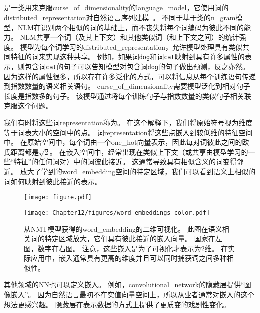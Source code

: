 \subsection{}
\label{sec:neural_language_models}

是一类用来克服\gls{curse_of_dimensionality}的\gls{language_model}，它使用词的\gls{distributed_representation}对自然语言序列建模~\citep{BenDucVin01-small}。
不同于基于类的\gls{n_gram}模型，\gls{NLM}在识别两个相似的词的基础上，而不丧失将每个词编码为彼此不同的能力。
\gls{NLM}共享一个词（及其上下文）和其他类似词（和上下文之间）的统计强度。
模型为每个词学习的\gls{distributed_representation}，允许模型处理具有类似共同特征的词来实现这种共享。
例如，如果词{\tt dog}和词{\tt cat}映射到具有许多属性的表示，则包含词{\tt cat}的句子可以告知模型对包含词{\tt dog}的句子做出预测，反之亦然。
因为这样的属性很多，所以存在许多泛化的方式，可以将信息从每个训练语句传递到指数数量的语义相关语句。
\gls{curse_of_dimensionality}需要模型泛化到相对句子长度是指数多的句子。
该模型通过将每个训练句子与指数数量的类似句子相关联克服这个问题。


我们有时将这些词\gls{representation}称为。
在这个解释下，我们将原始符号视为维度等于词表大小的空间中的点。
词\gls{representation}将这些点嵌入到较低维的特征空间中。
在原始空间中，每个词由一个\gls{one_hot}向量表示，因此每对词彼此之间的欧氏距离都是$\sqrt{2}$。
在嵌入空间中，经常出现在类似上下文（或共享由模型学习的一些``特征''的任何词对）中的词彼此接近。
这通常导致具有相似含义的词变得邻近。
放大了学到的\gls{word_embedding}空间的特定区域，我们可以看到语义上相似的词如何映射到彼此接近的表示。

\begin{figure}[htp]
\centering
\ifOpenSource
\centerline{\texttt{[image: figure.pdf]}}
\else
\texttt{[image: Chapter12/figures/word\_embeddings\_color.pdf]}
\fi
\caption{从\gls{NMT}模型获得的\gls{word_embedding}的二维可视化\citep{Bahdanau-et-al-ICLR2015-small}。
此图在语义相关词的特定区域放大，它们具有彼此接近的嵌入向量。
国家在左图，数字在右图。
注意，这些嵌入是为了可视化才表示为2维。
在实际应用中，嵌入通常具有更高的维度并且可以同时捕获词之间多种相似性。
}
\label{fig:chap12_word_embeddings_color}
\end{figure}

其他领域的\gls{NN}也可以定义嵌入。
例如，\gls{convolutional_network}的隐藏层提供``图像嵌入''。
因为自然语言最初不在实值向量空间上，所以从业者通常对嵌入的这个想法更感兴趣。
隐藏层在表示数据的方式上提供了更质变的戏剧性变化。

